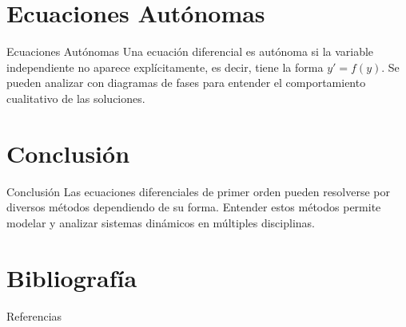 \documentclass{beamer}
\begin{document}
\section{Ecuaciones Autónomas}
\begin{frame}{Ecuaciones Autónomas}
Una ecuación diferencial es autónoma si la variable independiente no aparece explícitamente, es decir, tiene la forma $y' = f(y)$. Se pueden analizar con diagramas de fases para entender el comportamiento cualitativo de las soluciones.
\end{frame}

\section{Conclusión}
\begin{frame}{Conclusión}
Las ecuaciones diferenciales de primer orden pueden resolverse por diversos métodos dependiendo de su forma. Entender estos métodos permite modelar y analizar sistemas dinámicos en múltiples disciplinas.
\end{frame}

\section{Bibliografía}
\begin{frame}[allowframebreaks]{Referencias}


\end{frame}
\end{document}
